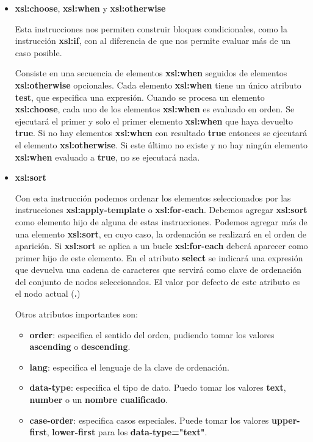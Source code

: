 \begin{itemize}
    \item \textbf{xsl:choose}, \textbf{xsl:when} y \textbf{xsl:otherwise}

    Esta instrucciones nos permiten construir bloques condicionales, como la instrucción \textbf{xsl:if}, con al diferencia de que nos permite evaluar más de un caso posible.

    Consiste en una secuencia de elementos \textbf{xsl:when} seguidos de elementos \textbf{xsl:otherwise} opcionales. Cada elemento \textbf{xsl:when} tiene un único atributo \textbf{test}, que especifica una expresión. Cuando se procesa un elemento \textbf{xsl:choose}, cada uno de los elementos \textbf{xsl:when} es evaluado en orden. Se ejecutará el primer y solo el primer	elemento \textbf{xsl:when} que haya devuelto \textbf{true}. Si no hay elementos \textbf{xsl:when} con resultado \textbf{true} entonces se ejecutará el elemento \textbf{xsl:otherwise}. Si este último no existe y no hay ningún elemento \textbf{xsl:when} evaluado a \textbf{true}, no se ejecutará nada.

    \item \textbf{xsl:sort}

    Con esta instrucción podemos ordenar los elementos seleccionados por las instrucciones \textbf{xsl:apply-template} o \textbf{xsl:for-each}. Debemos agregar \textbf{xsl:sort} como elemento hijo de alguna de estas instrucciones. Podemos agregar más de una elemento \textbf{xsl:sort}, en cuyo caso, la ordenación se realizará en el orden de aparición. Si \textbf{xsl:sort} se aplica a un bucle \textbf{xsl:for-each} deberá aparecer como primer hijo de este elemento. En el atributo \textbf{select} se indicará una expresión que devuelva una cadena de caracteres que servirá como clave de ordenación del conjunto de nodos seleccionados. El valor por defecto de este atributo es el nodo actual (\textbf{.})

    Otros atributos importantes son:

    \begin{itemize}
        \item \textbf{order}: especifica el sentido del orden, pudiendo tomar los valores \textbf{ascending} o \textbf{descending}.
        \item \textbf{lang}: especifica el lenguaje de la clave de ordenación.
        \item \textbf{data-type}: especifica el tipo de dato. Puedo tomar los valores \textbf{text}, \textbf{number} o un \textbf{nombre cualificado}.
        \item \textbf{case-order}: especifica casos especiales. Puede tomar los valores \textbf{upper-first}, \textbf{lower-first} para los \textbf{data-type="text"}.
    \end{itemize}


\end{itemize}

